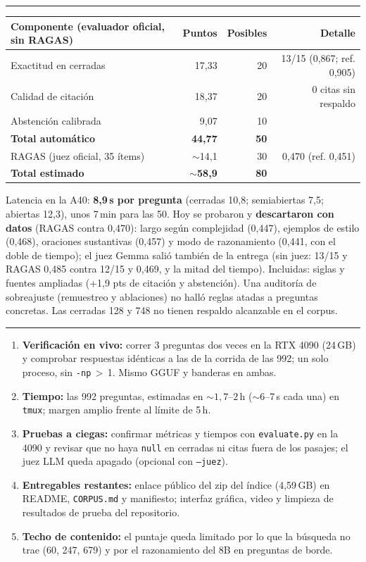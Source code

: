 \documentclass[10pt,letterpaper]{article}
\newcommand{\seccion}[1]{\vspace{3pt}{\large\bfseries #1}\par\vspace{-2pt}\hrule\vspace{3pt}}
\begin{document}
\seccion{4. Pruebas y resultados en \texttt{sample\_50}}
\begin{center}\small
\begin{tabular}{lrrr}\toprule
Componente (evaluador oficial, sin RAGAS) & Puntos & Posibles & Detalle\\\midrule
Exactitud en cerradas & 17,33 & 20 & 13/15 (0,867; ref. 0,905)\\
Calidad de citación & 18,37 & 20 & 0 citas sin respaldo\\
Abstención calibrada & 9,07 & 10 & \\\midrule
\textbf{Total automático} & \textbf{44,77} & \textbf{50} & \\
RAGAS (juez oficial, 35 ítems) & $\sim$14,1 & 30 & 0,470 (ref. 0,451)\\
\textbf{Total estimado} & \textbf{$\sim$58,9} & \textbf{80} & \\\bottomrule
\end{tabular}\end{center}
Latencia en la A40: \textbf{8,9\,s por pregunta} (cerradas 10,8; semiabiertas 7,5; abiertas 12,3), unos 7\,min para las 50. Hoy se probaron y \textbf{descartaron con datos} (RAGAS contra 0,470): largo según complejidad (0,447), ejemplos de estilo (0,468), oraciones sustantivas (0,457) y modo de razonamiento (0,441, con el doble de tiempo); el juez Gemma salió también de la entrega (sin juez: 13/15 y RAGAS 0,485 contra 12/15 y 0,469, y la mitad del tiempo). Incluidas: siglas y fuentes ampliadas (+1,9 pts de citación y abstención). Una auditoría de sobreajuste (remuestreo y ablaciones) no halló reglas atadas a preguntas concretas. Las cerradas 128 y 748 no tienen respaldo alcanzable en el corpus.

\seccion{5. Riesgos y próximos pasos (sábado)}
\begin{enumerate}
\item \textbf{Verificación en vivo:} correr 3 preguntas dos veces en la RTX 4090 (24\,GB) y comprobar respuestas idénticas a las de la corrida de las 992; un solo proceso, sin \texttt{-np}\,$>$\,1. Mismo GGUF y banderas en ambas.
\item \textbf{Tiempo:} las 992 preguntas, estimadas en ${\sim}1{,}7$--$2$\,h (${\sim}6$--7\,s cada una) en \texttt{tmux}; margen amplio frente al límite de 5\,h.
\item \textbf{Pruebas a ciegas:} confirmar métricas y tiempos con \texttt{evaluate.py} en la 4090 y revisar que no haya \texttt{null} en cerradas ni citas fuera de los pasajes; el juez LLM queda apagado (opcional con \texttt{--juez}).
\item \textbf{Entregables restantes:} enlace público del zip del índice (4,59\,GB) en README, \texttt{CORPUS.md} y manifiesto; interfaz gráfica, video y limpieza de resultados de prueba del repositorio.
\item \textbf{Techo de contenido:} el puntaje queda limitado por lo que la búsqueda no trae (60, 247, 679) y por el razonamiento del 8B en preguntas de borde.
\end{enumerate}
\end{document}
